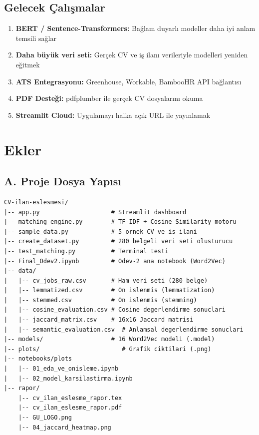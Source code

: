 \documentclass[12pt, a4paper]{article}
\begin{document}
\subsection{Gelecek Çalışmalar}

\begin{enumerate}
    \item \textbf{BERT / Sentence-Transformers:} Bağlam duyarlı modeller daha iyi anlam temsili sağlar
    \item \textbf{Daha büyük veri seti:} Gerçek CV ve iş ilanı verileriyle modelleri yeniden eğitmek
    \item \textbf{ATS Entegrasyonu:} Greenhouse, Workable, BambooHR API bağlantısı
    \item \textbf{PDF Desteği:} pdfplumber ile gerçek CV dosyalarını okuma
    \item \textbf{Streamlit Cloud:} Uygulamayı halka açık URL ile yayınlamak
\end{enumerate}

\section*{Ekler}

\subsection*{A. Proje Dosya Yapısı}

\begin{lstlisting}[style=kod, language={}, caption={GitHub Repo Yapısı}]
CV-ilan-eslesmesi/
|-- app.py                    # Streamlit dashboard
|-- matching_engine.py        # TF-IDF + Cosine Similarity motoru
|-- sample_data.py            # 5 ornek CV ve is ilani
|-- create_dataset.py         # 280 belgeli veri seti olusturucu
|-- test_matching.py          # Terminal testi
|-- Final_Odev2.ipynb         # Odev-2 ana notebook (Word2Vec)
|-- data/
|   |-- cv_jobs_raw.csv       # Ham veri seti (280 belge)
|   |-- lemmatized.csv        # On islenmis (lemmatization)
|   |-- stemmed.csv           # On islenmis (stemming)
|   |-- cosine_evaluation.csv # Cosine degerlendirme sonuclari
|   |-- jaccard_matrix.csv    # 16x16 Jaccard matrisi
|   |-- semantic_evaluation.csv  # Anlamsal degerlendirme sonuclari
|-- models/                   # 16 Word2Vec modeli (.model)
|-- plots/                       # Grafik ciktilari (.png)
|-- notebooks/plots
|   |-- 01_eda_ve_onisleme.ipynb
|   |-- 02_model_karsilastirma.ipynb
|-- rapor/
    |-- cv_ilan_eslesme_rapor.tex
    |-- cv_ilan_eslesme_rapor.pdf
    |-- GU_LOGO.png
    |-- 04_jaccard_heatmap.png
\end{lstlisting}
\end{document}
